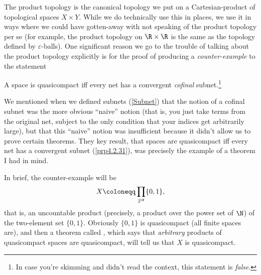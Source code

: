 The product topology is the canonical topology we put on a Cartesian-product of topological spaces $X\times Y$.  While we do technically use this in places, we use it in ways where we could have gotten-away with not speaking of the product topology per se (for example, the product topology on $\R \times \R$ is the same as the topology defined by $\varepsilon$-balls).  One significant reason we go to the trouble of talking about the product topology explicitly is for the proof of producing a \emph{counter-example} to the statement
\begin{important}
A space is quasicompact iff every net has a convergent \emph{cofinal} subnet.\footnote{In case you're skimming and didn't read the context, this statement is \emph{false}.}
\end{important}
We mentioned when we defined subnets (\cref{Subnet}) that the notion of a cofinal subnet was the more obvious ``naive'' notion (that is, you just take terms from the original net, subject to the only condition that your indices get arbitrarily large), but that this ``naive'' notion was insufficient because it didn't allow us to prove certain theorems.  They key result, that spaces are quasicompact iff every net has a convergent subnet (\cref{prp4.2.31}), was precisely the example of a theorem I had in mind.

In brief, the counter-example will be
\begin{equation}
X\coloneqq \prod _{2^{\N}}\{ 0,1\} ,
\end{equation}
that is, an uncountable product (precisely, a product over the power set of $\N$) of the two-element set $\{ 0,1\}$.  Obviously $\{ 0,1\}$ is quasicompact (all finite spaces are), and then a theorem called , which says that \emph{arbitrary} products of quasicompact spaces are quasicompact, will tell us that $X$ is quasicompact.

